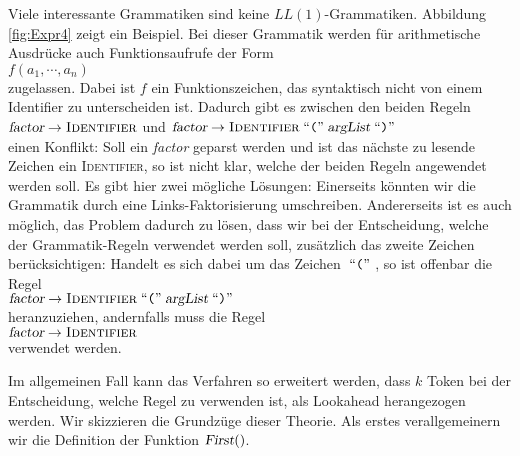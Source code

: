 \noindent
Viele interessante Grammatiken sind keine $LL(1)$-Grammatiken.
Abbildung \ref{fig:Expr4} zeigt ein Beispiel.  Bei dieser Grammatik werden f\"ur arithmetische
Ausdr\"ucke auch Funktionsaufrufe der Form
\\[0.2cm]
\hspace*{1.3cm}
$f(a_1, \cdots, a_n)$
\\[0.2cm]
zugelassen.  Dabei ist $f$ ein Funktionszeichen, das syntaktisch nicht von einem Identifier zu
unterscheiden ist.  Dadurch gibt es zwischen den beiden Regeln
\\[0.2cm]
\hspace*{1.3cm}
$\textsl{factor} \rightarrow \textsc{Identifier}$ \quad und \quad
$\textsl{factor} \rightarrow \textsc{Identifier} \;\mbox{``\texttt{(}''}\; \textsl{argList} \;\mbox{``\texttt{)}''}\;$ 
\\[0.2cm]
einen Konflikt:  Soll ein \textsl{factor} geparst werden und ist das n\"achste zu lesende Zeichen ein 
\textsc{Identifier}, so ist nicht klar, welche der beiden Regeln angewendet werden soll.
Es gibt hier zwei m\"ogliche L\"osungen:  Einerseits k\"onnten wir die Grammatik durch eine
Links-Faktorisierung umschreiben.  Andererseits ist es auch m\"oglich, das Problem dadurch zu l\"osen,
dass wir bei der Entscheidung, welche der Grammatik-Regeln verwendet werden soll, zus\"atzlich das
zweite Zeichen ber\"ucksichtigen:  Handelt es sich dabei um das Zeichen $\;\mbox{``\texttt{(}''}\;$, so ist offenbar die Regel
\\[0.2cm]
\hspace*{1.3cm}
$\textsl{factor} \rightarrow \textsc{Identifier} \;\mbox{``\texttt{(}''}\; \textsl{argList} \;\mbox{``\texttt{)}''}\;$ 
\\[0.2cm]
heranzuziehen, andernfalls muss die Regel
\\[0.2cm]
\hspace*{1.3cm}
$\textsl{factor} \rightarrow \textsc{Identifier}$ 
\\[0.2cm]
verwendet werden.

Im allgemeinen Fall kann das Verfahren so erweitert werden, dass $k$ Token bei der Entscheidung,
welche Regel zu verwenden ist, als Lookahead herangezogen werden.  
Wir skizzieren die Grundz\"uge dieser Theorie.
Als erstes verallgemeinern wir die Definition der Funktion $\textsl{First}()$.  

